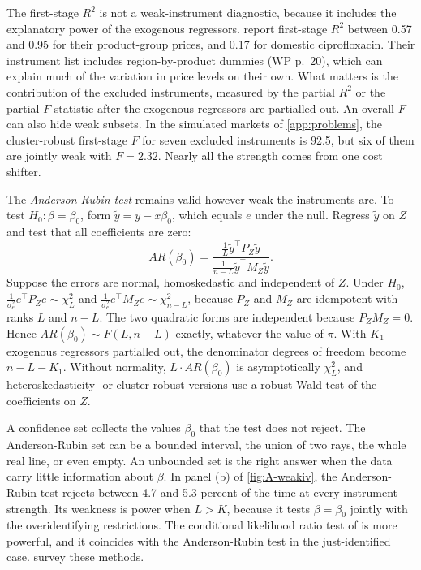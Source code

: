 The first-stage $R^2$ is not a weak-instrument diagnostic, because it includes the explanatory power of the
exogenous regressors. \citet[WP fn.~23]{ChaudhuriGoldbergJia2006} report first-stage $R^2$ between 0.57 and 0.95
for their product-group prices, and 0.17 for domestic ciprofloxacin. Their instrument list includes
region-by-product dummies (WP p.~20), which can explain much of the variation in price levels on their own. What
matters is the contribution of the excluded instruments, measured by the partial $R^2$ or the partial $F$
statistic after the exogenous regressors are partialled out. An overall $F$ can also hide weak subsets. In
the simulated markets of \cref{app:problems}, the cluster-robust first-stage $F$ for seven excluded instruments
is 92.5, but six of them are jointly weak with $F = 2.32$. Nearly all the strength comes from one cost shifter.

The \emph{Anderson-Rubin test} \citep{AndersonRubin1949} remains valid however weak the instruments are. To test
$H_0\colon\beta = \beta_0$, form $\tilde y = y - x\beta_0$, which equals $e$ under the null. Regress $\tilde y$ on $Z$
and test that all coefficients are zero:
\begin{equation}\label{eq:A-ar}
AR(\beta_0) = \frac{\frac{1}{L}\tilde y^\top P_Z\tilde y}{\frac{1}{n - L}\tilde y^\top M_Z\tilde y} .
\end{equation}
Suppose the errors are normal, homoskedastic and independent of $Z$. Under $H_0$,
$\frac{1}{\sigma_e^2}e^\top P_Ze \sim \chi^2_L$ and $\frac{1}{\sigma_e^2}e^\top M_Ze \sim \chi^2_{n - L}$, because $P_Z$ and
$M_Z$ are idempotent with ranks $L$ and $n - L$. The two quadratic forms are independent because $P_ZM_Z = 0$.
Hence $AR(\beta_0) \sim F(L, n - L)$ exactly, whatever the value of $\pi$. With $K_1$ exogenous regressors partialled
out, the denominator degrees of freedom become $n - L - K_1$. Without normality, $L \cdot AR(\beta_0)$ is
asymptotically $\chi^2_L$, and heteroskedasticity- or cluster-robust versions use a robust Wald test of the
coefficients on $Z$.

A confidence set collects the values $\beta_0$ that the test does not reject. The Anderson-Rubin set can be a
bounded interval, the union of two rays, the whole real line, or even empty. An unbounded set is the right
answer when the data carry little information about $\beta$. In panel (b) of \cref{fig:A-weakiv}, the
Anderson-Rubin test rejects between 4.7 and 5.3 percent of the time at every instrument strength. Its
weakness is power when $L > K$, because it tests $\beta = \beta_0$ jointly with the overidentifying restrictions.
The conditional likelihood ratio test of \citet{Moreira2003} is more powerful, and it coincides with the
Anderson-Rubin test in the just-identified case. \citet{AndrewsStockSun2019} survey these methods.

